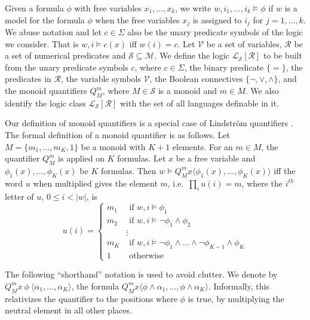 \documentclass[envcountsame]{llncs}
\newcommand{\mon}[2]{Q_{#1}^{#2}}
\begin{document}
Given a formula $\phi$ with free variables $x_1,\dots,x_k$, we write $w,i_1,\dots,i_k\models\phi$ if $w$ is a model for the formula $\phi$ when the free variables $x_j$ is assigned to $i_j$ for $j=1,\dots,k$.
We abuse notation and let $c \in \Sigma$ also be the unary predicate symbols of the logic we consider. That is $w,i\models c(x)$ iff $w(i)=c$. 
Let $\mathcal{V}$ be a set of variables, $\mathcal{R}$ be a set of numerical predicates and $\mathcal{S \subseteq M}$. We define the
logic $\mathcal{L_S[\mathcal R]}$ to be built from the unary predicate symbols $c$, where $c \in \Sigma$, the binary predicate $\{=\}$,
the predicates in $\mathcal{R}$, the variable symbols $\mathcal{V}$, the Boolean connectives $\{\neg,\vee,\wedge\}$, and the monoid
quantifiers $\mon{M}{m}$, where $M \in \mathcal{S}$ is a monoid and $m \in M$. We also identify the logic class $\mathcal{L_S[\mathcal
R]}$ with the set of all languages definable in it.

Our definition of monoid quantifiers is a special case of Lindstr\"om quantifiers \cite{lin_genQuant}. The formal definition of a
monoid quantifier \cite{barr_uniformNC1} is as follows. Let $M=\{m_1,\dots,m_{K},1\}$ be a monoid with $K+1$ elements. For an $m \in
M$, the quantifier $\mon{M}{m}$ is applied on $K$ formulas. Let $x$ be a free variable and $\phi_1(x),\dots,\phi_{K}(x)$ be  $K$ formulas. Then 
$w \models \mon{M}{m} x \langle \phi_1(x),\dots,\phi_{K}(x) \rangle$
iff the word $u$ when multiplied gives the element $m$, i.e.\  $\prod_i u(i) = m$, where the $i^{th}$ letter of $u$, $0 \leq i < |w|$, is 
$$u(i) = \left\{ \begin{array}{rl}
 m_1 & \mbox{ if } w,i \models \phi_1\\
 m_2 & \mbox{ if } w,i \models \neg \phi_1 \wedge \phi_2\\
     & \vdots	\\
 m_{K} & \mbox{ if } w,i \models \neg \phi_1 \wedge \dots \wedge \neg \phi_{K-1} \wedge \phi_{K}\\
 1 & \mbox{ otherwise}
\end{array} \right.$$

The following ``shorthand'' notation is used to avoid clutter. We denote by $\mon{M}{m} x ~\phi~ \langle\alpha_1,\dots,\alpha_K\rangle$, the formula
$\mon{M}{m} x\langle \phi \wedge \alpha_1,\dots,\phi \wedge \alpha_K \rangle$. Informally, this relativizes the quantifier to the positions where $\phi$ is true, by multiplying the neutral element in all other places.
\end{document}

